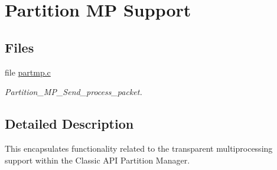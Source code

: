 \hypertarget{group__ClassicPartMP}{}\section{Partition MP Support}
\label{group__ClassicPartMP}
\subsection*{Files}
\begin{DoxyCompactItemize}
\item 
file \mbox{\hyperlink{partmp_8c}{partmp.\+c}}
\begin{DoxyCompactList}\small\item\em Partition\+\_\+\+M\+P\+\_\+\+Send\+\_\+process\+\_\+packet. \end{DoxyCompactList}\end{DoxyCompactItemize}


\subsection{Detailed Description}
This encapsulates functionality related to the transparent multiprocessing support within the Classic A\+PI Partition Manager. 
